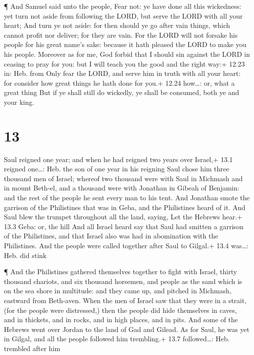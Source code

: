  ¶ And Samuel said unto the people, Fear not: ye have done
all this wickedness: yet turn not aside from following the LORD, but
serve the LORD with all your heart;  And turn ye not aside:
for then should ye go after vain things, which cannot profit nor
deliver; for they are vain.  For the LORD will not forsake
his people for his great name's sake: because it hath pleased the LORD
to make you his people.  Moreover as for me, God forbid
that I should sin against the LORD in ceasing to pray for you: but I
will teach you the good and the right way:+ 12.23 in: Heb. from
 Only fear the LORD, and serve him in truth with all your
heart: for consider how great things he hath done for you.+ 12.24
how\ldots: or, what a great thing  But if ye shall still do
wickedly, ye shall be consumed, both ye and your king.

\hypertarget{section-12}{%
\section{13}\label{section-12}}

 Saul reigned one year; and when he had reigned two years
over Israel,+ 13.1 reigned one\ldots: Heb. the son of one year in his
reigning  Saul chose him three thousand men of Israel;
whereof two thousand were with Saul in Michmash and in mount Beth-el,
and a thousand were with Jonathan in Gibeah of Benjamin: and the rest of
the people he sent every man to his tent.  And Jonathan
smote the garrison of the Philistines that was in Geba, and the
Philistines heard of it. And Saul blew the trumpet throughout all the
land, saying, Let the Hebrews hear.+ 13.3 Geba: or, the hill
 And all Israel heard say that Saul had smitten a garrison
of the Philistines, and that Israel also was had in abomination with the
Philistines. And the people were called together after Saul to Gilgal.+
13.4 was\ldots: Heb. did stink

 ¶ And the Philistines gathered themselves together to fight
with Israel, thirty thousand chariots, and six thousand horsemen, and
people as the sand which is on the sea shore in multitude: and they came
up, and pitched in Michmash, eastward from Beth-aven.  When
the men of Israel saw that they were in a strait, (for the people were
distressed,) then the people did hide themselves in caves, and in
thickets, and in rocks, and in high places, and in pits. 
And some of the Hebrews went over Jordan to the land of Gad and Gilead.
As for Saul, he was yet in Gilgal, and all the people followed him
trembling.+ 13.7 followed\ldots: Heb. trembled after him

